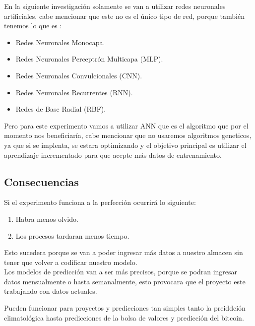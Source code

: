     En la siguiente investigación solamente se van a utilizar redes neuronales artificiales, cabe mencionar que este no es el único tipo de red, porque también tenemos lo que es \cite{royo2021}:
    \begin{itemize}
        \item Redes Neuronales Monocapa.
        \item Redes Neuronales Perceptrón Multicapa (MLP).
        \item Redes Neuronales Convulcionales (CNN).
        \item Redes Neuronales Recurrentes (RNN).
        \item Redes de Base Radial (RBF).
    \end{itemize}
    Pero para este experimento vamos a utilizar ANN que es el algoritmo que por el momento nos beneficiaría, cabe mencionar que no usaremos algoritmos geneticos, ya que si se implenta, se estara
    optimizando y el objetivo principal es utilizar el aprendizaje incrementado para que acepte más datos de entrenamiento.

\subsection{Consecuencias}

    Si el experimento funciona a la perfecci\'on ocurrir\'a lo siguiente:
    \begin{enumerate}
        \item Habra menos olvido.
        \item Los procesos tardaran menos tiempo.
    \end{enumerate}

    Esto sucedera porque se van a poder ingresar m\'as datos a nuestro almacen sin 
    tener que volver a codificar nuestro modelo.\\
    Los modelos de predicci\'on van a ser m\'as precisos, porque se podran ingresar 
    datos mensualmente o hasta semanalmente, esto provocara que el proyecto este trabajando 
    con datos actuales.

    Pueden funcionar para proyectos y predicciones tan simples tanto la preiddci\'on climatol\'ogica
    hasta predicciones de la bolsa de valores y predicci\'on del bitcoin.

